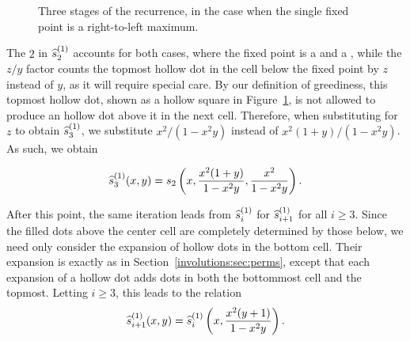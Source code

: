 \begin{figure}[t]
    \caption{Three stages of the recurrence, in the case when the single
            fixed point is a right-to-left maximum.}
    \label{involutions:fig:3stages}
    \end{figure}


    The $2$ in $\widehat{s}^{(1)}_2$ accounts for both cases, where the fixed point is a
    \rtlmax{} and a \ltrmin{}, while the $z/y$ factor counts the topmost
    hollow dot in the cell below the fixed point by $z$ instead of $y$, as it
    will require special care. By our definition of greediness, this topmost
    hollow dot, shown as a hollow square in
    Figure~\ref{involutions:fig:3stages}, is not allowed to produce an
    hollow dot above it in the next cell. Therefore, when substituting for $z$ to
    obtain $\widehat{s}^{(1)}_3$, we substitute $x^2/(1-x^2y)$ instead of
    $x^2(1+y)/(1-x^2y)$. As such, we obtain


    $$ \widehat{s}^{(1)}_3(x,y)
        =s_2\left(x, \frac{x^2(1+y)}{1-x^2y}, \frac{x^2}{1-x^2y}\right). $$

    After this point, the same iteration leads from $\widehat{s}^{(1)}_i$ for $\widehat{s}^{(1)}_{i+1}$
    for all $i \geq 3$. Since the filled dots above the center cell are
    completely determined by those below, we need only consider the expansion
    of hollow dots in the bottom cell. Their expansion is exactly as in
    Section~\ref{involutions:sec:perms}, except that each expansion of a hollow
    dot adds dots in both the bottommost cell and the topmost. Letting $i \geq
    3$, this leads to the relation
    \begin{equation}\label{involutions:eqn:iteration-inv}
      \widehat{s}^{(1)}_{i+1}(x,y) = \widehat{s}^{(1)}_i \left(x, \frac{x^2(y+1)}{1-x^2y} \right).
    \end{equation}

